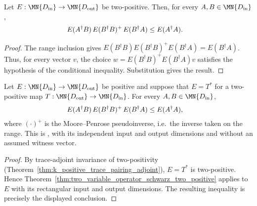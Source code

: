 \begin{theorem}
    \label{thm:two_variable_operator_schwarz_two_positive}
    \leanok
    Let $E:\MN{D_{\rm in}}\to\MN{D_{\rm out}}$ be two-positive. Then, for
    every $A,B\in\MN{D_{\rm in}}$,
    \begin{align}
        E(A^\dagger B)\,E(B^\dagger B)^{+}\,E(B^\dagger A)
         & \le E(A^\dagger A).
        \notag
    \end{align}
\end{theorem}

\begin{proof}\leanok
    The range inclusion gives
    $E(B^\dagger B)E(B^\dagger B)^+E(B^\dagger A)=E(B^\dagger A)$.
    Thus, for every vector $v$, the choice
    $w=E(B^\dagger B)^+E(B^\dagger A)v$ satisfies the hypothesis of the
    conditional inequality. Substitution gives the result.
\end{proof}

\begin{theorem}
    \label{thm:two_variable_operator_schwarz}
    \leanok
    Let $E:\MN{D_{\rm in}}\to\MN{D_{\rm out}}$ be positive and suppose
    that $E=T^*$ for a two-positive map
    $T:\MN{D_{\rm out}}\to\MN{D_{\rm in}}$. For every
    $A,B\in\MN{D_{\rm in}}$,
    \begin{align}
        E(A^\dagger B)\,E(B^\dagger B)^{+}\,E(B^\dagger A)
         & \le E(A^\dagger A),
        \notag
    \end{align}
    where $(\cdot)^+$ is the Moore--Penrose pseudoinverse, i.e.\ the
    inverse taken on the range. This is \cite[Eq.~(5.4)]{Wolf2012Quantum},
    with its independent input and output dimensions and without an assumed
    witness vector.
\end{theorem}

\begin{proof}\leanok
    By trace-adjoint invariance of two-positivity
    (Theorem~\ref{thm:k_positive_trace_pairing_adjoint}), $E=T^*$ is
    two-positive. Hence
    Theorem~\ref{thm:two_variable_operator_schwarz_two_positive} applies to
    $E$ with its rectangular input and output dimensions. The resulting
    inequality is precisely the displayed conclusion.
\end{proof}


